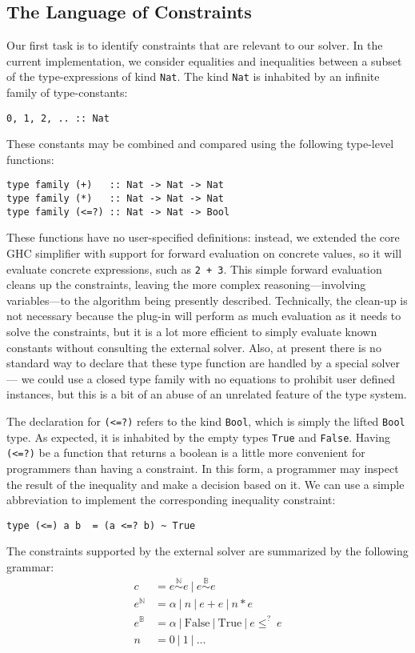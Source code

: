\documentclass{sigplanconf}
\begin{document}
\subsection{The Language of Constraints}
Our first task is to identify constraints that are relevant to our solver.
In the current implementation, we consider equalities and inequalities
between a subset of the type-expressions of kind \Verb"Nat".
The kind \Verb"Nat" is
inhabited by an infinite family of type-constants:
\begin{Verbatim}
0, 1, 2, .. :: Nat
\end{Verbatim}
These constants may be combined and compared using the following
type-level functions:
\begin{Verbatim}
type family (+)   :: Nat -> Nat -> Nat
type family (*)   :: Nat -> Nat -> Nat
type family (<=?) :: Nat -> Nat -> Bool
\end{Verbatim}
These functions have no user-specified definitions: instead, we extended
the core GHC simplifier with support for forward evaluation on concrete
values, so it will evaluate concrete expressions, such as \Verb"2 + 3".
This simple forward evaluation cleans up the constraints, leaving the more
complex reasoning---involving variables---to the algorithm being presently
described.  Technically, the clean-up is not necessary because the
plug-in will perform as much evaluation as it needs to solve the constraints,
but it is a lot more efficient to simply evaluate known constants without
consulting the external solver.  Also, at present there is no standard
way to declare that these type function are handled by a special solver---%
we could use a closed type family with no equations to prohibit user
defined instances, but this is a bit of an abuse of an unrelated feature
of the type system.

The declaration for \Verb"(<=?)" refers to the kind \Verb"Bool", which
is simply the lifted \Verb"Bool" type.  As expected, it is inhabited by the
empty types \Verb"True" and \Verb"False".   Having \Verb"(<=?)" be a function
that returns a boolean is a little more convenient for programmers than having
a constraint. In this form, a programmer may inspect the result of the
inequality and make a decision based on it.  We can use a simple
abbreviation to implement the corresponding inequality constraint:
\begin{Verbatim}
type (<=) a b  = (a <=? b) ~ True
\end{Verbatim}

The constraints supported by the external solver are summarized by the
following grammar:
\begin{align*}
c & = e \overset {\mathbb{N}} \sim e ~|~  e \overset {\mathbb{B}} \sim e \\
e^\mathbb{N} & = \alpha ~|~ n ~|~ e + e ~|~ n * e \\
e^\mathbb{B} & = \alpha ~|~ \mathrm{False} ~|~ \mathrm{True} ~|~ e \leq^? ~e \\
n          & = 0 ~|~ 1 ~|~ \dots
\end{align*}
\end{document}
